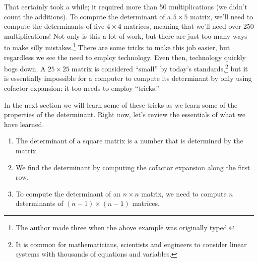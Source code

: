 \medskip

That certainly took a while; it required more than 50 multiplications (we didn't count the additions). To compute the determinant of a $5\times5$ matrix, we'll need to compute the determinants of five $4\times 4$ matrices, meaning that we'll need over 250 multiplications! Not only is this a lot of work, but there are just too many ways to make silly mistakes.\footnote{The author made three when the above example was originally typed.} There are some tricks to make this job easier, but regardless we see the need to employ technology. Even then, technology quickly bogs down. A $25 \times 25$ matrix is considered ``small'' by today's standards,\footnote{It is common for mathematicians, scientists and engineers to consider linear systems with thousands of equations and variables.} but it is essentially impossible for a computer to compute its determinant by only using cofactor expansion; it too needs to employ ``tricks.''

In the next section we will learn some of these tricks as we learn some of the properties of the determinant. Right now, let's review the essentials of what we have learned. 
	\begin{enumerate}
	\item		The determinant of a square matrix is a number that is determined by the matrix.
	\item		We find the determinant by computing the cofactor expansion along the first row.
	\item		To compute the determinant of an $n\times n$ matrix, we need to compute $n$ determinants of $(n-1)\times(n-1)$ matrices.
	\end{enumerate}
	



